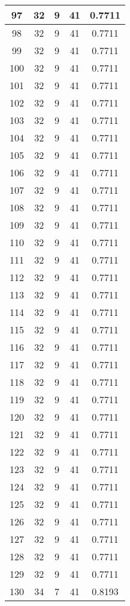 \documentclass[letterpaper, 12pt]{article}
\begin{document}
\begin{longtable}{|c|c|c|c|c|}
\hline
97 & 32 & 9 & 41 & 0.7711 \\
\hline
98 & 32 & 9 & 41 & 0.7711 \\
\hline
99 & 32 & 9 & 41 & 0.7711 \\
\hline
100 & 32 & 9 & 41 & 0.7711 \\
\hline
101 & 32 & 9 & 41 & 0.7711 \\
\hline
102 & 32 & 9 & 41 & 0.7711 \\
\hline
103 & 32 & 9 & 41 & 0.7711 \\
\hline
104 & 32 & 9 & 41 & 0.7711 \\
\hline
105 & 32 & 9 & 41 & 0.7711 \\
\hline
106 & 32 & 9 & 41 & 0.7711 \\
\hline
107 & 32 & 9 & 41 & 0.7711 \\
\hline
108 & 32 & 9 & 41 & 0.7711 \\
\hline
109 & 32 & 9 & 41 & 0.7711 \\
\hline
110 & 32 & 9 & 41 & 0.7711 \\
\hline
111 & 32 & 9 & 41 & 0.7711 \\
\hline
112 & 32 & 9 & 41 & 0.7711 \\
\hline
113 & 32 & 9 & 41 & 0.7711 \\
\hline
114 & 32 & 9 & 41 & 0.7711 \\
\hline
115 & 32 & 9 & 41 & 0.7711 \\
\hline
116 & 32 & 9 & 41 & 0.7711 \\
\hline
117 & 32 & 9 & 41 & 0.7711 \\
\hline
118 & 32 & 9 & 41 & 0.7711 \\
\hline
119 & 32 & 9 & 41 & 0.7711 \\
\hline
120 & 32 & 9 & 41 & 0.7711 \\
\hline
121 & 32 & 9 & 41 & 0.7711 \\
\hline
122 & 32 & 9 & 41 & 0.7711 \\
\hline
123 & 32 & 9 & 41 & 0.7711 \\
\hline
124 & 32 & 9 & 41 & 0.7711 \\
\hline
125 & 32 & 9 & 41 & 0.7711 \\
\hline
126 & 32 & 9 & 41 & 0.7711 \\
\hline
127 & 32 & 9 & 41 & 0.7711 \\
\hline
128 & 32 & 9 & 41 & 0.7711 \\
\hline
129 & 32 & 9 & 41 & 0.7711 \\
\hline
130 & 34 & 7 & 41 & 0.8193 \\

\end{longtable}
\end{document}
